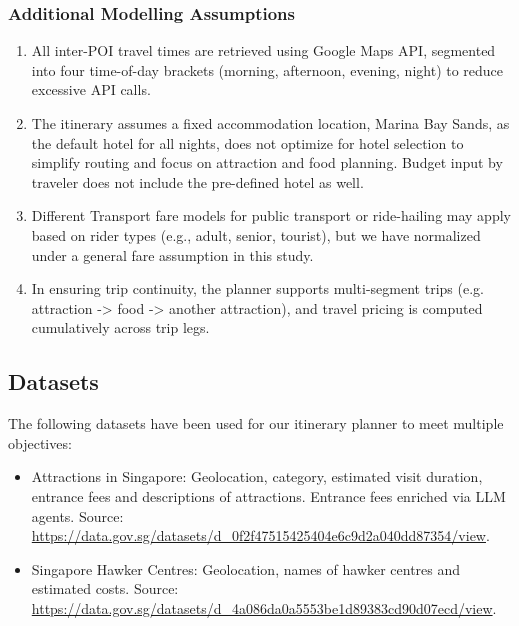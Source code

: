 \documentclass{ecai}
\begin{document}
\subsubsection{Additional Modelling Assumptions}
\begin{enumerate}
    \item All inter-POI travel times are retrieved using Google Maps API, segmented into four time-of-day brackets (morning, afternoon, evening, night) to reduce excessive API calls.
    \item The itinerary assumes a fixed accommodation location, Marina Bay Sands, as the default hotel for all nights, does not optimize for hotel selection to simplify routing and focus on attraction and food planning. Budget input by traveler does not include the pre-defined hotel as well.
    \item Different Transport fare models for public transport or ride-hailing may apply based on rider types (e.g., adult, senior, tourist), but we have normalized under a general fare assumption in this study.
    \item In ensuring trip continuity, the planner supports multi-segment trips (e.g. attraction -> food -> another attraction), and travel pricing is computed cumulatively across trip legs.
\end{enumerate}

\subsection{Datasets}
The following datasets have been used for our itinerary planner to meet multiple objectives:
\begin{itemize}
    \item Attractions in Singapore: Geolocation, category, estimated visit duration, entrance fees and descriptions of attractions. Entrance fees enriched via LLM agents. Source: \url{https://data.gov.sg/datasets/d_0f2f47515425404e6c9d2a040dd87354/view}.
    \item Singapore Hawker Centres: Geolocation, names of hawker centres and estimated costs. Source: \url{https://data.gov.sg/datasets/d_4a086da0a5553be1d89383cd90d07ecd/view}.
\end{itemize}
\end{document}

